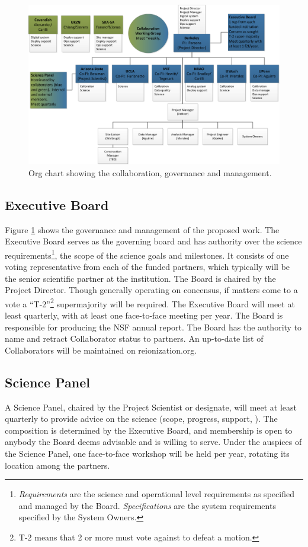 \documentclass[preprint]{aastex}
\begin{document}
\begin{figure}[h]
\centering
\includegraphics[width=\textwidth]{plots/org.png}
\caption{Org chart showing the collaboration, governance and management.}
\label{fig:org}
\end{figure}

\subsection{Executive Board}
Figure \ref{fig:org} shows the governance and management of the proposed work. 
The Executive Board serves as the governing board and has authority over the science 
requirements\footnote{{\em Requirements} are the science and operational level requirements as
specified and managed by the Board.  {\em Specifications} are the system requirements
specified by the System Owners.}, the scope of the science goals and milestones. It consists 
of one voting representative from each of the funded partners, which typically will be the 
senior scientific partner at the institution. The Board is chaired by the Project Director. Though 
generally operating on concensus, if matters come to a vote a ``T-2''\footnote{T-2 means that 2
or more must vote against to defeat a motion.} supermajority will be required. The
Executive Board will meet at least quarterly, with at least one face-to-face meeting
per year. The Board is responsible for producing the NSF annual report.  The Board has the
authority to name and retract Collaborator status to partners.  An up-to-date list of Collaborators
will be maintained on reionization.org.

\subsection{Science Panel}
A Science Panel, chaired by the Project Scientist or designate, will meet at least
quarterly to provide advice on the science (scope, progress, support, ). The
composition is determined by the Executive Board, and membership is open to anybody
the Board deems advisable and is willing to serve. Under the auspices of the Science
Panel, one face-to-face workshop will be held per year, rotating its location among
the partners.
\end{document}

